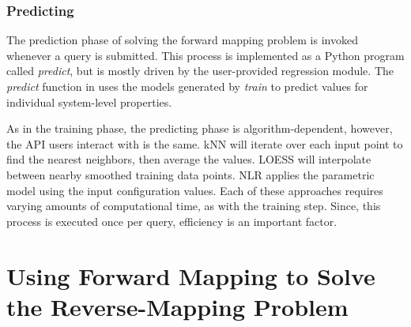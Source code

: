 \subsubsection{Predicting}

The prediction phase of solving the forward mapping problem  is invoked whenever a query is submitted.
This process is implemented as a Python program called \textit{predict}, but is mostly driven by the user-provided regression module.
The \textit{predict} function in \fw uses the models generated by \textit{train} to predict values for individual system-level properties.

As in the training phase, the predicting phase is algorithm-dependent, however, the API users interact with is the same.
kNN will iterate over each input point to find the nearest neighbors, then average the values.
LOESS will interpolate between nearby smoothed training data points.
NLR applies the parametric model using the input configuration values.
Each of these approaches requires varying amounts of computational time, as with the training step.
Since, this process is executed once per  query, efficiency is an important factor.


\section{Using Forward Mapping to Solve the Reverse-Mapping Problem}

